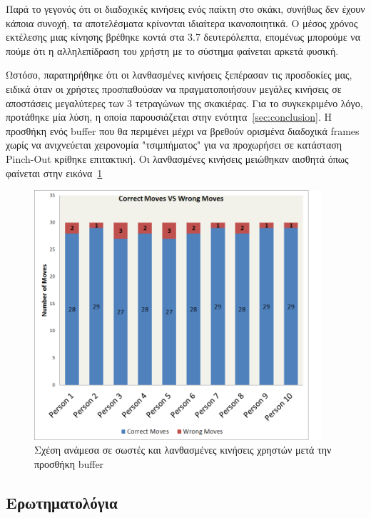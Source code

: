 Παρά το γεγονός ότι οι διαδοχικές κινήσεις ενός παίκτη στο σκάκι, συνήθως δεν έχουν κάποια συνοχή, τα αποτελέσματα κρίνονται ιδιαίτερα ικανοποιητικά. Ο μέσος χρόνος εκτέλεσης μιας κίνησης βρέθηκε κοντά στα 3.7 δευτερόλεπτα, επομένως μπορούμε να πούμε ότι η αλληλεπίδραση του χρήστη με το σύστημα φαίνεται αρκετά φυσική. 


Ωστόσο, παρατηρήθηκε ότι οι λανθασμένες κινήσεις ξεπέρασαν τις προσδοκίες μας, ειδικά όταν οι χρήστες προσπαθούσαν να πραγματοποιήσουν μεγάλες κινήσεις σε αποστάσεις μεγαλύτερες των 3 τετραγώνων της σκακιέρας. Για το συγκεκριμένο λόγο, προτάθηκε μία λύση, η οποία παρουσιάζεται στην ενότητα~\ref{sec:conclusion}. Η προσθήκη ενός buffer που θα περιμένει μέχρι να βρεθούν ορισμένα διαδοχικά frames χωρίς να ανιχνεύεται χειρονομία "τσιμπήματος" για να προχωρήσει σε κατάσταση Pinch-Out κρίθηκε επιτακτική. Οι λανθασμένες κινήσεις μειώθηκαν αισθητά όπως φαίνεται στην εικόνα~\ref{fig:correctmoves2}

\begin{figure}[H]
    \centering
    \includegraphics[width=0.95\textwidth]{Files/Figures/correctmoves2.png}
    \caption[Σχέση ανάμεσα σε σωστές και λανθασμένες κινήσεις χρηστών μετά την προσθήκη buffer]{Σχέση ανάμεσα σε σωστές και λανθασμένες κινήσεις χρηστών μετά την προσθήκη buffer}
    \label{fig:correctmoves2}
\end{figure}




\subsection{Ερωτηματολόγια}

